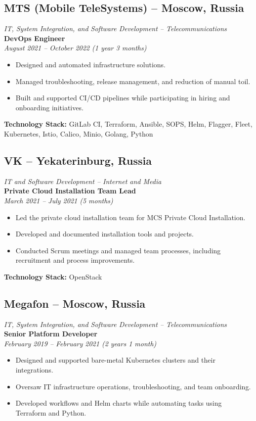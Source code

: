 \documentclass[12pt,a4paper]{article}
\begin{document}
\subsection*{MTS (Mobile TeleSystems) – Moscow, Russia}
\textit{IT, System Integration, and Software Development – Telecommunications}\\
\textbf{DevOps Engineer}\\
\textit{August 2021 – October 2022 (1 year 3 months)}
\begin{itemize}
    \item Designed and automated infrastructure solutions.
    \item Managed troubleshooting, release management, and reduction of manual toil.
    \item Built and supported CI/CD pipelines while participating in hiring and onboarding initiatives.
\end{itemize}
\textbf{Technology Stack:} GitLab CI, Terraform, Ansible, SOPS, Helm, Flagger, Fleet, Kubernetes, Istio, Calico, Minio, Golang, Python

\subsection*{VK – Yekaterinburg, Russia}
\textit{IT and Software Development – Internet and Media}\\
\textbf{Private Cloud Installation Team Lead}\\
\textit{March 2021 – July 2021 (5 months)}
\begin{itemize}
    \item Led the private cloud installation team for MCS Private Cloud Installation.
    \item Developed and documented installation tools and projects.
    \item Conducted Scrum meetings and managed team processes, including recruitment and process improvements.
\end{itemize}
\textbf{Technology Stack:} OpenStack

\subsection*{Megafon – Moscow, Russia}
\textit{IT, System Integration, and Software Development – Telecommunications}\\
\textbf{Senior Platform Developer}\\
\textit{February 2019 – February 2021 (2 years 1 month)}
\begin{itemize}
    \item Designed and supported bare-metal Kubernetes clusters and their integrations.
    \item Oversaw IT infrastructure operations, troubleshooting, and team onboarding.
    \item Developed workflows and Helm charts while automating tasks using Terraform and Python.
\end{itemize}
\end{document}
